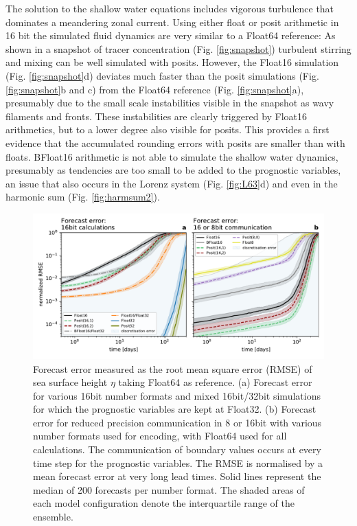 \documentclass[draft]{agujournal2019}
\begin{document}
The solution to the shallow water equations includes vigorous turbulence that dominates a meandering zonal current. Using either float or posit arithmetic in 16 bit the simulated fluid dynamics are very similar to a Float64 reference: As shown in a snapshot of tracer concentration (Fig. \ref{fig:snapshot}) turbulent stirring and mixing can be well simulated with posits. However, the Float16 simulation (Fig. \ref{fig:snapshot}d) deviates much faster than the posit simulations (Fig. \ref{fig:snapshot}b and c) from the Float64 reference (Fig. \ref{fig:snapshot}a), presumably due to the small scale instabilities visible in the snapshot as wavy filaments and fronts. These instabilities are clearly triggered by Float16 arithmetics, but to a lower degree also visible for posits. This provides a first evidence that the accumulated rounding errors with posits are smaller than with floats. BFloat16 arithmetic is not able to simulate the shallow water dynamics, presumably as tendencies are too small to be added to the prognostic variables, an issue that also occurs in the Lorenz system (Fig. \ref{fig:L63}d) and even in the harmonic sum (Fig. \ref{fig:harmsum2}).

\begin{figure}
\includegraphics[width=1\textwidth]{../plots/rmse_eta.pdf}
\caption{Forecast error measured as the root mean square error (RMSE) of sea surface height $\eta$ taking Float64 as reference. (a) Forecast error for various 16bit number formats and mixed 16bit/32bit simulations for which the prognostic variables are kept at Float32. (b) Forecast error for reduced precision communication in 8 or 16bit with various number formats used for encoding, with Float64 used for all calculations.  The communication of boundary values occurs at every time step for the prognostic variables. The RMSE is normalised by a mean forecast error at very long lead times. Solid lines represent the median of 200 forecasts per number format. The shaded areas of each model configuration denote the interquartile range of the ensemble.}
\label{fig:rmse}
\end{figure}
\end{document}
